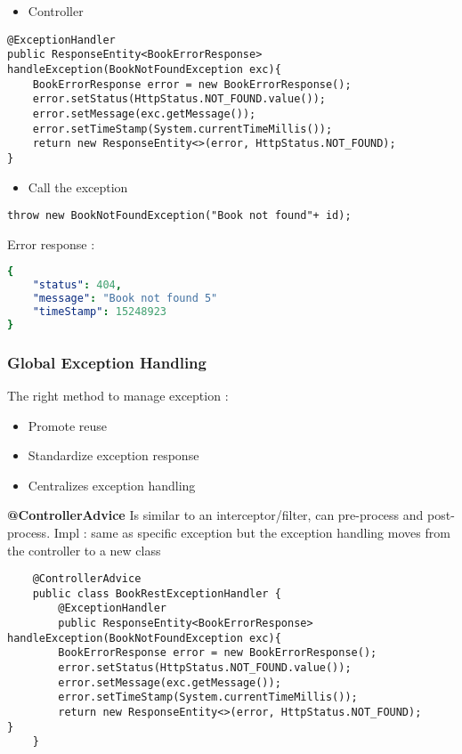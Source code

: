 \documentclass[a4paper, 12pt]{article}
\begin{document}
    \begin{itemize}
        \item Controller
    \end{itemize}
    \begin{lstlisting}
@ExceptionHandler
public ResponseEntity<BookErrorResponse> handleException(BookNotFoundException exc){
    BookErrorResponse error = new BookErrorResponse();
    error.setStatus(HttpStatus.NOT_FOUND.value());
    error.setMessage(exc.getMessage());
    error.setTimeStamp(System.currentTimeMillis());
    return new ResponseEntity<>(error, HttpStatus.NOT_FOUND);
}
    \end{lstlisting}
    \begin{itemize}
        \item Call the exception
    \end{itemize}
    \begin{lstlisting}
throw new BookNotFoundException("Book not found"+ id);
    \end{lstlisting}

    Error response :
    \begin{lstlisting}[language=yaml]
{
    "status": 404,
    "message": "Book not found 5"
    "timeStamp": 15248923
}
    \end{lstlisting}

    \subsubsection{Global Exception Handling}
    The right method to manage exception :
    \begin{itemize}
        \item Promote reuse
        \item Standardize exception response
        \item Centralizes exception handling
    \end{itemize}

    \textbf{@ControllerAdvice}
    Is similar to an interceptor/filter, can pre-process and post-process.
    Impl : same as specific exception but the exception handling moves from the controller to a new class
    \begin{lstlisting}
    @ControllerAdvice
    public class BookRestExceptionHandler {
        @ExceptionHandler
        public ResponseEntity<BookErrorResponse> handleException(BookNotFoundException exc){
        BookErrorResponse error = new BookErrorResponse();
        error.setStatus(HttpStatus.NOT_FOUND.value());
        error.setMessage(exc.getMessage());
        error.setTimeStamp(System.currentTimeMillis());
        return new ResponseEntity<>(error, HttpStatus.NOT_FOUND);
}
    }
    \end{lstlisting}
\end{document}
